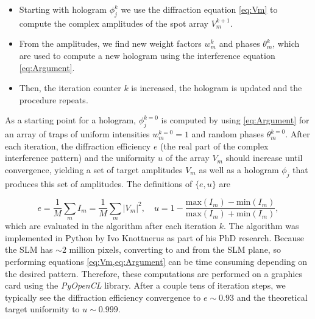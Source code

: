 \begin{itemize}
    \item Starting with hologram $\phi_j^k$ we use the diffraction equation \cref{eq:Vm} to compute the complex amplitudes of the spot array $V_m^{k+1}$. 
    
    \item From the amplitudes, we find new weight factors $w_m^k$ and phases $\theta_m^k$, which are used to compute a new hologram using the interference equation \cref{eq:Argument}.
    
    \item Then, the iteration counter $k$ is increased, the hologram is updated and the procedure repeats. 
\end{itemize}
As a starting point for a hologram, $\phi_j^{k=0}$ is computed by using \cref{eq:Argument} for an array of traps of uniform intensities $w_m^{k=0} = 1$ and random phases $\theta_m^{k=0}$.
After each iteration, the diffraction efficiency $e$ (the real part of the complex interference pattern) and the uniformity $u$ of the array $V_m$ should increase until convergence, yielding a set of target amplitudes $V_m$ as well as a hologram $\phi_j$ that produces this set of amplitudes.
The definitions of $\{e,u\}$ are 

\begin{equation}\label{eq:EfficiencyUniformity}
    e = \frac{1}{M}\sum_m I_m = \frac{1}{M}\sum_m |V_m|^2, 
    \quad 
    u = 1-\frac{\text{max}(I_m)-\text{min}(I_m)}{\text{max}(I_m)+\text{min}(I_m)},
\end{equation}
which are evaluated in the algorithm after each iteration $k$. 
The algorithm was implemented in Python by Ivo Knottnerus as part of his PhD research.
Because the SLM has $\sim 2$ million pixels, converting to and from the SLM plane, so performing equations \cref{eq:Vm,eq:Argument} can be time consuming depending on the desired pattern.
Therefore, these computations are performed on a graphics card using the \textit{PyOpenCL} library. 
After a couple tens of iteration steps, we typically see the diffraction efficiency convergence to $e \sim 0.93$ and the theoretical target uniformity to $u \sim 0.999$.

